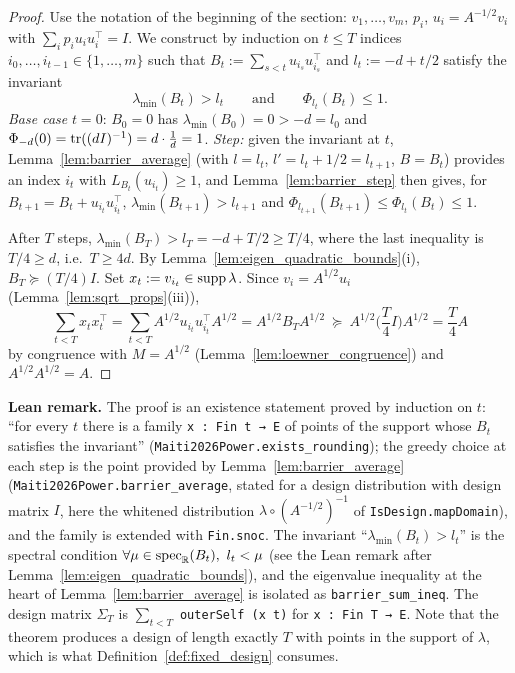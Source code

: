 \begin{proof}
\leanok
{}
Use the notation of the beginning of the section: $v_1,\dots,v_m$, $p_i$, $u_i = A^{-1/2}v_i$
with $\sum_ip_iu_iu_i^\top = I$. We construct by induction on $t \le T$ indices
$i_0,\dots,i_{t-1} \in \{1,\dots,m\}$ such that $B_t := \sum_{s<t}u_{i_s}u_{i_s}^\top$ and
$l_t := -d + t/2$ satisfy the invariant
\[
  \lambda_{\min}(B_t) > l_t \qquad\text{and}\qquad \Phi_{l_t}(B_t) \le 1 .
\]
\emph{Base case} $t = 0$: $B_0 = 0$ has $\lambda_{\min}(B_0) = 0 > -d = l_0$ and
$\Phi_{-d}(0) = \operatorname{tr}((dI)^{-1}) = d\cdot\frac1d = 1$.
\emph{Step:} given the invariant at $t$, Lemma~\ref{lem:barrier_average} (with $l = l_t$,
$l' = l_t + 1/2 = l_{t+1}$, $B = B_t$) provides an index $i_t$ with $L_{B_t}(u_{i_t}) \ge 1$, and
Lemma~\ref{lem:barrier_step} then gives, for $B_{t+1} = B_t + u_{i_t}u_{i_t}^\top$,
$\lambda_{\min}(B_{t+1}) > l_{t+1}$ and $\Phi_{l_{t+1}}(B_{t+1}) \le \Phi_{l_t}(B_t) \le 1$.

After $T$ steps, $\lambda_{\min}(B_T) > l_T = -d + T/2 \ge T/4$, where the last inequality is
$T/4 \ge d$, i.e.\ $T \ge 4d$. By Lemma~\ref{lem:eigen_quadratic_bounds}(i), $B_T \succeq (T/4)I$.
Set $x_t := v_{i_t} \in \operatorname{supp}\lambda$. Since $v_i = A^{1/2}u_i$ (Lemma~\ref{lem:sqrt_props}(iii)),
\[
  \sum_{t<T}x_tx_t^\top = \sum_{t<T}A^{1/2}u_{i_t}u_{i_t}^\top A^{1/2} = A^{1/2}B_TA^{1/2}
  \ \succeq\ A^{1/2}\Big(\frac T4 I\Big)A^{1/2} = \frac T4 A
\]
by congruence with $M = A^{1/2}$ (Lemma~\ref{lem:loewner_congruence}) and $A^{1/2}A^{1/2} = A$.
\end{proof}

\textbf{Lean remark.} The proof is an existence statement proved by induction on $t$:
``for every $t$ there is a family \texttt{x : Fin t → E} of points of the support whose $B_t$
satisfies the invariant'' (\texttt{Maiti2026Power.exists\_rounding}); the greedy choice at each step is
the point provided by Lemma~\ref{lem:barrier_average} (\texttt{Maiti2026Power.barrier\_average}, stated
for a design distribution with design matrix $I$, here the whitened distribution
$\lambda \circ (A^{-1/2})^{-1}$ of \texttt{IsDesign.mapDomain}), and the family is extended with
\texttt{Fin.snoc}. The invariant ``$\lambda_{\min}(B_t) > l_t$'' is the spectral condition
$\forall \mu \in \operatorname{spec}_{\mathbb{R}}(B_t),\ l_t < \mu$ (see the Lean remark after
Lemma~\ref{lem:eigen_quadratic_bounds}), and the eigenvalue inequality at the heart of
Lemma~\ref{lem:barrier_average} is isolated as \texttt{barrier\_sum\_ineq}. The design matrix
$\Sigma_T$ is $\sum_{t<T}$ \texttt{outerSelf (x t)} for \texttt{x : Fin T → E}. Note that
the theorem produces a design of length exactly $T$ with points in the support of $\lambda$,
which is what Definition~\ref{def:fixed_design} consumes.

